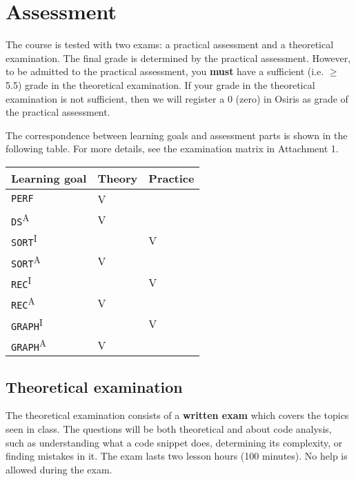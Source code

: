 \section{Assessment}
	The course is tested with two exams: a practical assessment and a theoretical examination. The final grade is determined by the practical assessment. However, to be admitted to the practical assessment, you \textbf{must} have a sufficient (i.e. $\geq$ 5.5) grade in the theoretical examination. If your grade in the theoretical examination is not sufficient, then we will register a 0 (zero) in Osiris as grade of the practical assessment.
	
	The correspondence between learning goals and assessment parts is shown in the following table. For more details, see the examination matrix in Attachment 1. \\
	
	\begin{table}[h]
		\centering
	\begin{tabular}{ |l|l|l| }
		\hline
		\textbf{Learning goal} & \textbf{Theory} & \textbf{Practice} \\
		\hline
		\texttt{PERF} & V & \\
		\hline 
		\texttt{DS}\textsuperscript{A} & V & \\
		\hline 
		\texttt{SORT}\textsuperscript{I} & & V \\
		\hline 
		\texttt{SORT}\textsuperscript{A} & V & \\
		\hline 
		\texttt{REC}\textsuperscript{I} & & V \\
		\hline 
		\texttt{REC}\textsuperscript{A} & V &  \\
		\hline 
		\texttt{GRAPH}\textsuperscript{I} & & V \\
		\hline 
		\texttt{GRAPH}\textsuperscript{A} & V & \\
		\hline 
	\end{tabular}
	\end{table}

	\subsection{Theoretical examination}
	The theoretical examination consists of a \textbf{written exam} which covers the topics seen in class. The questions will be both theoretical and about code analysis, such as understanding what a code snippet does, determining its complexity, or finding mistakes in it.
	The exam lasts two lesson hours (100 minutes). No help is allowed during the exam.\\
	

